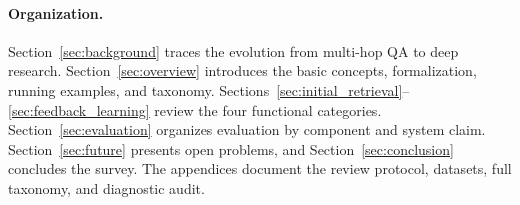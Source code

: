 \paragraph{Organization.}
Section~\ref{sec:background} traces the evolution from multi-hop QA to deep research. Section~\ref{sec:overview} introduces the basic concepts, formalization, running examples, and taxonomy. Sections~\ref{sec:initial_retrieval}--\ref{sec:feedback_learning} review the four functional categories. Section~\ref{sec:evaluation} organizes evaluation by component and system claim. Section~\ref{sec:future} presents open problems, and Section~\ref{sec:conclusion} concludes the survey. The appendices document the review protocol, datasets, full taxonomy, and diagnostic audit.

